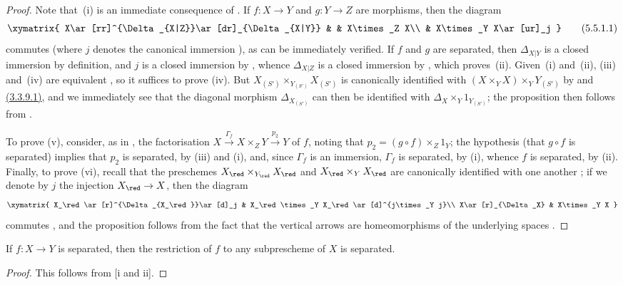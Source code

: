 \begin{proof}
Note that~(i) is an immediate consequence of .
If $f:X\to Y$ and $g:Y\to Z$ are morphisms, then the diagram
\[
\label{I.5.5.1.1}
  \xymatrix{
    X\ar[rr]^{\Delta_{X|Z}}\ar[dr]_{\Delta_{X|Y}} & &
    X\times_Z X\\
    & X\times_Y X\ar[ur]_j
  }
  \tag{5.5.1.1}
\]
commutes (where $j$ denotes the canonical immersion ), as can be immediately verified.
If $f$ and $g$ are separated, then $\Delta_{X|Y}$ is a closed immersion by definition, and $j$ is a closed immersion by , whence $\Delta_{X|Z}$ is a closed immersion by , which
proves~(ii).
Given~(i) and~(ii), (iii) and~(iv) are equivalent , so it suffices to prove (iv).
But $X_{(S')}\times_{Y_{(S')}}X_{(S')}$ is canonically identified with $(X\times_Y X)\times_Y Y_{(S')}$ by  and \hyperref[I.3.3.9.1]{(3.3.9.1)}, and we immediately see that the diagonal morphism $\Delta_{X_{(S')}}$ can then be identified with $\Delta_X\times_Y 1_{Y_{(S')}}$;
the proposition then follows from .

To prove (v), consider, as in , the factorisation $X\xrightarrow{\Gamma_f}X\times_Z Y\xrightarrow{p_2}Y$ of $f$, noting that $p_2=(g\circ f)\times_Z 1_Y$;
the hypothesis (that $g\circ f$ is separated) implies that $p_2$ is separated, by (iii) and (i), and, since $\Gamma_f$ is an immersion, $\Gamma_f$ is separated, by (i), whence $f$ is separated, by (ii).
Finally, to prove (vi), recall that the preschemes $X_\red\times_{Y_\red}X_\red$ and $X_\red\times_Y X_\red$ are canonically identified with one another ;
if we denote by $j$ the injection $X_\red\to X$, then the diagram
\[
  \xymatrix{
    X_\red\ar[r]^{\Delta_{X_\red}}\ar[d]_j &
    X_\red\times_Y X_\red\ar[d]^{j\times_Y j}\\
    X\ar[r]_{\Delta_X} &
    X\times_Y X
  }
\]
commutes , and the proposition follows from the fact that the vertical arrows are homeomorphisms of the underlying spaces .
\end{proof}

\begin{corollary}[5.5.2]
\label{I.5.5.2}
If $f:X\to Y$ is separated, then the restriction of $f$ to any subprescheme of $X$ is separated.
\end{corollary}

\begin{proof}
This follows from [i and ii].
\end{proof}

